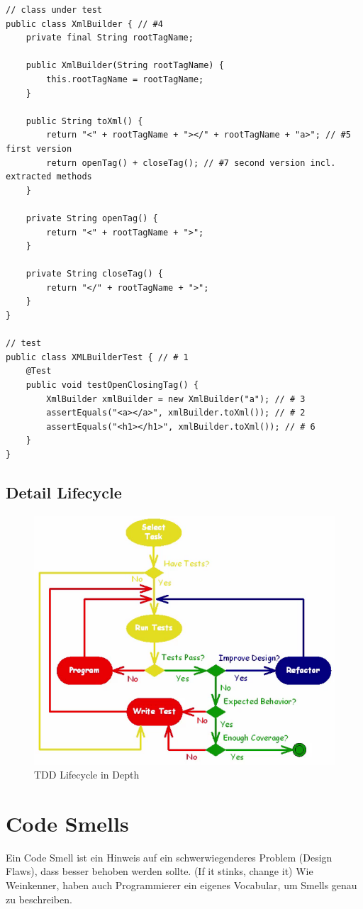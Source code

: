 \begin{lstlisting}
// class under test
public class XmlBuilder { // #4
	private final String rootTagName;

	public XmlBuilder(String rootTagName) {
		this.rootTagName = rootTagName;
	}
	
	public String toXml() {
		return "<" + rootTagName + "></" + rootTagName + "a>"; // #5 first version
		return openTag() + closeTag(); // #7 second version incl. extracted methods
	}
	
	private String openTag() {
		return "<" + rootTagName + ">";
	}
	
	private String closeTag() {
		return "</" + rootTagName + ">";
	}
}

// test
public class XMLBuilderTest { // # 1
	@Test
	public void testOpenClosingTag() {
		XmlBuilder xmlBuilder = new XmlBuilder("a"); // # 3
		assertEquals("<a></a>", xmlBuilder.toXml()); // # 2
		assertEquals("<h1></h1>", xmlBuilder.toXml()); // # 6
	}
}
\end{lstlisting}

\subsection{Detail Lifecycle}
\begin{figure}[h!]
	\centering
	\includegraphics[width=0.8\linewidth]{img/tdd_cycle_detail}
	\caption{TDD Lifecycle in Depth}
	\label{fig:tddcycledetail}
\end{figure}

\section{Code Smells}
Ein Code Smell ist ein Hinweis auf ein schwerwiegenderes Problem (Design Flaws), dass besser behoben werden sollte. (If it stinks, change it) Wie Weinkenner, haben auch Programmierer ein eigenes Vocabular, um Smells genau zu beschreiben.

